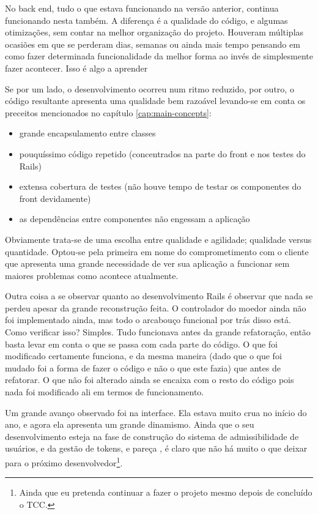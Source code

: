 No back end, tudo o que estava funcionando  na versão anterior, continua funcionando nesta também. A diferença
é a qualidade do código, e algumas otimizações, sem contar na melhor organização do projeto. Houveram múltiplas
ocasiões em que se perderam dias, semanas ou ainda mais tempo pensando em como fazer determinada funcionalidade da melhor forma ao invés de simplesmente fazer acontecer. Isso é algo a aprender

Se por um lado, o desenvolvimento ocorreu num ritmo reduzido, por outro, o código resultante apresenta uma
qualidade bem razoável levando-se em conta os preceitos mencionados no capítulo \ref{cap:main-concepts}:
\begin{itemize}
    \item grande encapsulamento entre classes
    \item pouquíssimo código repetido (concentrados na parte do front e nos testes do Rails)
    \item extensa cobertura de testes (não houve tempo de testar os componentes do front devidamente)
    \item as dependências entre componentes não engessam a aplicação
\end{itemize}

Obviamente trata-se de uma escolha entre qualidade e agilidade; qualidade versus quantidade. Optou-se pela primeira em
nome do comprometimento com o cliente que apresenta uma grande necessidade de ver sua aplicação a funcionar sem maiores
problemas como acontece atualmente.

Outra coisa a se observar quanto ao desenvolvimento Rails é observar que nada se perdeu apesar da grande reconstrução
feita. O controlador do moedor ainda não foi implementado ainda, mas todo o arcabouço funcional por trás disso está.
Como verificar isso? Simples. Tudo funcionava antes da grande refatoração, então basta levar em conta o que se passa com
cada parte do código. O que foi modificado certamente funciona, e da mesma maneira (dado que o que foi
mudado foi a forma de fazer o código e não o que este fazia) que antes de refatorar. O que não foi alterado ainda se encaixa com o resto do
código pois nada foi modificado ali em termos de funcionamento.

Um grande avanço observado foi na interface. Ela estava muito crua no início do ano, e agora ela apresenta um grande
dinamismo. Ainda que o seu desenvolvimento esteja na fase de construção do sistema de admissibilidade de usuários, e da
gestão de tokens, e pareça , é claro que não há muito o que deixar para o próximo desenvolvedor\footnote{Ainda
que eu pretenda continuar a fazer o projeto mesmo depois de concluído o TCC.}.

